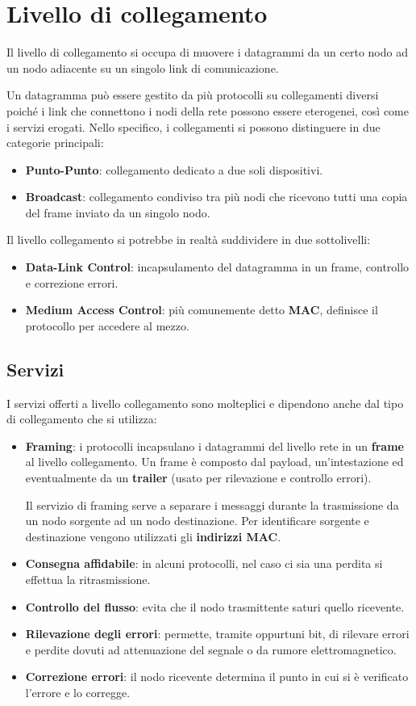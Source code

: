 \chapter{Livello di collegamento}
Il livello di collegamento si occupa di muovere i datagrammi da un 
certo nodo ad un nodo adiacente su un singolo link di comunicazione.

Un datagramma può essere gestito da più protocolli su collegamenti 
diversi poiché i link che connettono i nodi della rete possono essere
eterogenei, così come i servizi erogati. Nello specifico, i 
collegamenti si possono distinguere in due categorie principali:
\begin{itemize}
	\item \textbf{Punto-Punto}: collegamento dedicato a due soli 
		dispositivi.
	\item \textbf{Broadcast}: collegamento condiviso tra più nodi che 
		ricevono tutti una copia del frame inviato da un singolo nodo.
\end{itemize}
Il livello collegamento si potrebbe in realtà suddividere in due 
sottolivelli:
\begin{itemize}
	\item \textbf{Data-Link Control}: incapsulamento del datagramma in
		un frame, controllo e correzione errori.
	\item \textbf{Medium Access Control}: più comunemente detto 
		\textbf{MAC}, definisce il protocollo per accedere al mezzo.
\end{itemize}

\section{Servizi}
I servizi offerti a livello collegamento sono molteplici e dipendono
anche dal tipo di collegamento che si utilizza:
\begin{itemize}
	\item \textbf{Framing}: i protocolli incapsulano i datagrammi del
		livello rete in un \textbf{frame} al livello collegamento. Un 
		frame è composto dal payload, un'intestazione ed eventualmente
		da un \textbf{trailer} (usato per rilevazione e controllo 
		errori).

		Il servizio di framing serve a separare i messaggi durante la
		trasmissione da un nodo sorgente ad un nodo destinazione. Per
		identificare sorgente e destinazione vengono utilizzati gli
		\textbf{indirizzi MAC}.
	\item \textbf{Consegna affidabile}: in alcuni protocolli, nel caso
		ci sia una perdita si effettua la ritrasmissione.
	\item \textbf{Controllo del flusso}: evita che il nodo trasmittente
		saturi quello ricevente.
	\item \textbf{Rilevazione degli errori}: permette, tramite 
		oppurtuni bit, di rilevare errori e perdite dovuti ad 
		attenuazione del segnale o da rumore elettromagnetico.
	\item \textbf{Correzione errori}: il nodo ricevente determina il
		punto in cui si è verificato l'errore e lo corregge.
\end{itemize}

